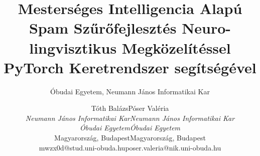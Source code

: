 \documentclass[lettersize,journal]{IEEEtran}
\begin{document}
\title{Mesterséges Intelligencia Alapú Spam Szűrőfejlesztés Neuro-lingvisztikus Megközelítéssel PyTorch Keretrendszer segítségével}
\author{Óbudai Egyetem, Neumann János Informatikai Kar}


\author{%
  \begin{tabular}{ccc}
      \small{Tóth Balázs} & \small{Póser Valéria} \\
      \small{\it{Neumann János Informatikai Kar}} & \small{\it{Neumann János Informatikai Kar}} \\
      \small{\it{Óbudai Egyetem}} & \small{\it{Óbudai Egyetem}} \\
      \small{Magyarország, Budapest}  & \small{Magyarország, Budapest} \\
      \small{mwzx0d@stud.uni-obuda.hu}  & \small{poser.valeria@nik.uni-obuda.hu}
  \end{tabular}
}

\maketitle







\end{document}
